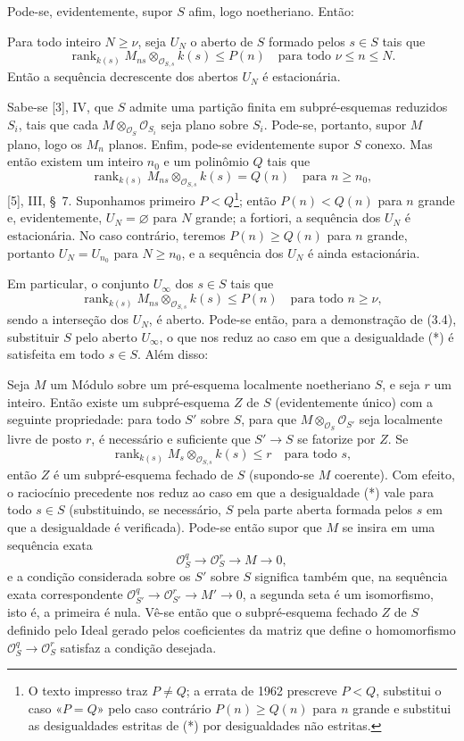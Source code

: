 Pode-se, evidentemente, supor $S$ afim, logo noetheriano. Então:

 Para todo inteiro $N\geq\nu$, seja $U_N$ o aberto de $S$
formado pelos $s\in S$ tais que
\[
\operatorname{rank}_{k(s)}
M_{ns}\otimes_{\mathcal O_{S,s}}k(s)\leq P(n)
\quad\text{para todo $\nu\leq n\leq N$}.
\]
Então a sequência decrescente dos abertos $U_N$ é estacionária.

Sabe-se [3], IV, que $S$ admite uma partição finita em subpré-esquemas
reduzidos $S_i$, tais que cada
$M\otimes_{\mathcal O_S}\mathcal O_{S_i}$ seja plano sobre $S_i$. Pode-se,
portanto, supor $M$ plano, logo os $M_n$ planos. Enfim, pode-se evidentemente
supor $S$ conexo. Mas então existem um inteiro $n_0$ e um polinômio $Q$ tais
que
\[
\operatorname{rank}_{k(s)}
M_{ns}\otimes_{\mathcal O_{S,s}}k(s)=Q(n)
\quad\text{para $n\geq n_0$},
\]
[5], III, \S~7. Suponhamos primeiro $P<Q$\footnote{O texto impresso traz
$P\neq Q$; a errata de 1962 prescreve $P<Q$, substitui o caso «$P=Q$» pelo
caso contrário $P(n)\geq Q(n)$ para $n$ grande e substitui as desigualdades
estritas de (*) por desigualdades não estritas.}; então $P(n)<Q(n)$ para $n$
grande e, evidentemente, $U_N=\varnothing$ para $N$ grande; a fortiori, a
sequência dos $U_N$ é estacionária. No caso contrário, teremos
$P(n)\geq Q(n)$ para $n$ grande, portanto $U_N=U_{n_0}$ para $N\geq n_0$, e
a sequência dos $U_N$ é ainda estacionária.

Em particular, o conjunto $U_\infty$ dos $s\in S$ tais que
\[
\tag{*}
\operatorname{rank}_{k(s)}
M_{ns}\otimes_{\mathcal O_{S,s}}k(s)\leq P(n)
\quad\text{para todo $n\geq\nu$},
\]
sendo a interseção dos $U_N$, é aberto. Pode-se então, para a demonstração de
(3.4), substituir $S$ pelo aberto $U_\infty$, o que nos reduz ao caso em que a
desigualdade (*) é satisfeita em todo $s\in S$. Além disso:

 Seja $M$ um Módulo sobre um pré-esquema localmente
noetheriano $S$, e seja $r$ um inteiro. Então existe um subpré-esquema $Z$ de
$S$ (evidentemente único) com a seguinte propriedade: para todo $S'$ sobre
$S$, para que $M\otimes_{\mathcal O_S}\mathcal O_{S'}$ seja localmente
livre de posto $r$, é necessário e suficiente que $S'\longrightarrow S$ se
fatorize por $Z$. Se
\[
\operatorname{rank}_{k(s)}
M_s\otimes_{\mathcal O_{S,s}}k(s)\leq r
\quad\text{para todo $s$},
\]
então $Z$ é um subpré-esquema fechado de $S$ (supondo-se $M$ coerente).
Com efeito, o raciocínio precedente nos reduz ao caso em que a desigualdade
(*) vale para todo $s\in S$ (substituindo, se necessário, $S$ pela parte
aberta formada pelos $s$ em que a desigualdade é verificada). Pode-se então
supor que $M$ se insira em uma sequência exata
\[
\mathcal O_S^q\longrightarrow\mathcal O_S^r\longrightarrow M\longrightarrow0,
\]
e a condição considerada sobre os $S'$ sobre $S$ significa também que, na
sequência exata correspondente
$\mathcal O_{S'}^q\longrightarrow\mathcal O_{S'}^r
\longrightarrow M'\longrightarrow0$, a segunda seta é um isomorfismo, isto
é, a primeira é nula. Vê-se então que o subpré-esquema fechado $Z$ de $S$
definido pelo Ideal gerado pelos coeficientes da matriz que define o
homomorfismo $\mathcal O_S^q\longrightarrow\mathcal O_S^r$ satisfaz a
condição desejada.

